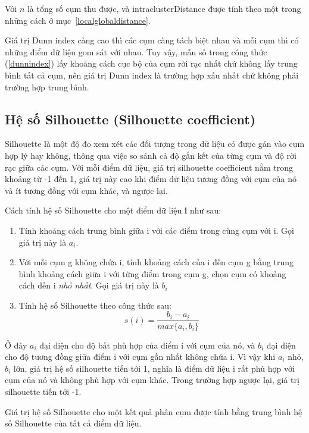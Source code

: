 		Với $n$ là tổng số cụm thu được, và intraclusterDistance được tính theo một trong những cách ở mục~\ref{localglobaldistance}.
		
	Giá trị Dunn index càng cao thì các cụm càng tách biệt nhau và mỗi cụm thì có những điểm dữ liệu gom sát với nhau. Tuy vậy, mẫu số trong công thức (\ref{dunnindex}) lấy khoảng cách cục bộ của cụm rời rạc nhất chứ không lấy trung bình tất cả cụm, nên giá trị Dunn index là trường hợp xấu nhất chứ không phải trường hợp trung bình.
	\subsection{Hệ số Silhouette (Silhouette coefficient)}
	
	Silhouette là một độ đo xem xét các đối tượng trong dữ liệu có được gán vào cụm hợp lý hay không, thông qua việc so sánh cả độ gắn kết của từng cụm và độ rời rạc giữa các cụm. Với mỗi điểm dữ liệu, giá trị silhouette coefficient nằm trong khoảng từ -1 đến 1, giá trị này cao khi điểm dữ liệu tương đồng với cụm của nó và ít tương đồng với cụm khác, và ngược lại. 
	
	Cách tính hệ số Silhouette cho một điểm dữ liệu \textbf{i} như sau:
	\begin{enumerate}
		\item Tính khoảng cách trung bình giữa i với các điểm trong cùng cụm với i. Gọi giá trị này là $a_i$.
		\item Với mỗi cụm g không chứa i, tính khoảng cách của i đến cụm g bằng trung bình khoảng cách giữa i với từng điểm trong cụm g, chọn cụm có khoảng cách đến i \textit{nhỏ nhất}. Gọi giá trị này là $b_i$
		\item Tính hệ số Silhouette theo công thức sau:
		\begin{equation}
		s(i) = \frac{b_i - a_i}{max\{a_i,b_i\}}
		\end{equation}
	\end{enumerate}
	
	Ở đây $a_i$ đại diện cho độ bất phù hợp của điểm i với cụm của nó, và $b_i$ đại diện cho độ tương đồng giữa điểm i với cụm gần nhất không chứa i. Vì vậy khi $a_i$ nhỏ, $b_i$ lớn, giá trị hệ số silhouette tiến tới 1, nghĩa là điểm dữ liệu i rất phù hợp với cụm của nó và không phù hợp với cụm khác. Trong trường hợp ngược lại, giá trị silhouette tiến tới -1.
	
	Giá trị hệ số Silhouette cho một kết quả phân cụm được tính bằng trung bình hệ số Silhouette của tất cả điểm dữ liệu.

